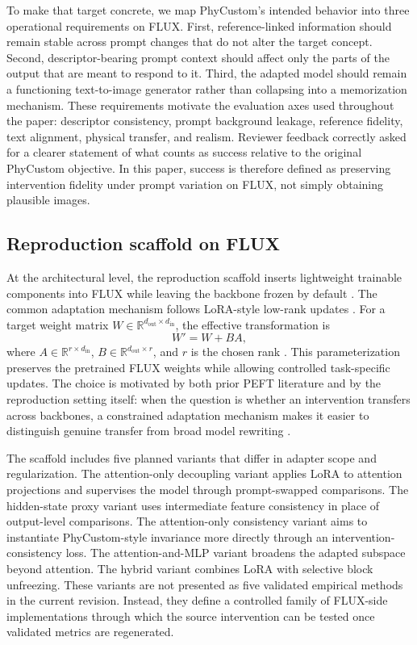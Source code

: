 \documentclass{article}
\begin{document}
To make that target concrete, we map PhyCustom's intended behavior into three operational requirements on FLUX. First, reference-linked information should remain stable across prompt changes that do not alter the target concept. Second, descriptor-bearing prompt context should affect only the parts of the output that are meant to respond to it. Third, the adapted model should remain a functioning text-to-image generator rather than collapsing into a memorization mechanism. These requirements motivate the evaluation axes used throughout the paper: descriptor consistency, prompt background leakage, reference fidelity, text alignment, physical transfer, and realism. Reviewer feedback correctly asked for a clearer statement of what counts as success relative to the original PhyCustom objective. In this paper, success is therefore defined as preserving intervention fidelity under prompt variation on FLUX, not simply obtaining plausible images.

\subsection{Reproduction scaffold on FLUX}

At the architectural level, the reproduction scaffold inserts lightweight trainable components into FLUX while leaving the backbone frozen by default \cite{blackforestlabs2024fluxdev}. The common adaptation mechanism follows LoRA-style low-rank updates \cite{hu2021lora}. For a target weight matrix \(W \in \mathbb{R}^{d_{\text{out}}\times d_{\text{in}}}\), the effective transformation is
\[
W' = W + BA,
\]
where \(A \in \mathbb{R}^{r \times d_{\text{in}}}\), \(B \in \mathbb{R}^{d_{\text{out}} \times r}\), and \(r\) is the chosen rank \cite{hu2021lora}. This parameterization preserves the pretrained FLUX weights while allowing controlled task-specific updates. The choice is motivated by both prior PEFT literature and by the reproduction setting itself: when the question is whether an intervention transfers across backbones, a constrained adaptation mechanism makes it easier to distinguish genuine transfer from broad model rewriting \cite{hu2021lora}.

The scaffold includes five planned variants that differ in adapter scope and regularization. The attention-only decoupling variant applies LoRA to attention projections and supervises the model through prompt-swapped comparisons. The hidden-state proxy variant uses intermediate feature consistency in place of output-level comparisons. The attention-only consistency variant aims to instantiate PhyCustom-style invariance more directly through an intervention-consistency loss. The attention-and-MLP variant broadens the adapted subspace beyond attention. The hybrid variant combines LoRA with selective block unfreezing. These variants are not presented as five validated empirical methods in the current revision. Instead, they define a controlled family of FLUX-side implementations through which the source intervention can be tested once validated metrics are regenerated.
\end{document}
